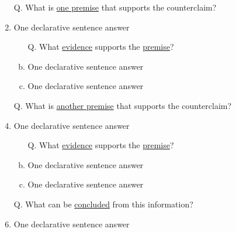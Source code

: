 \documentclass[a4paper, 12pt]{article}
\begin{document}
\begin{CJK*}{UTF8}{bsmi}
\begin{enumerate}[I.]
\begin{enumerate}[A.]
                        \begin{enumerate}[1.]
                            \item[Q.] What is \underline{one premise} that supports the {\color{red}counterclaim}?
                            \item{\color{gray} One declarative sentence answer} %
                                  \begin{enumerate}[a.]
                                      \item [Q.] What \underline{evidence} supports the \underline{premise}?
                                      \item {\color{gray} One declarative sentence answer} %
                                      \item {\color{gray} One declarative sentence answer} %
                                  \end{enumerate}
                            \item [Q.] What is \underline{another premise} that supports the {\color{red}counterclaim}?
                            \item{\color{gray} One declarative sentence answer} %
                                  \begin{enumerate}[a.]
                                      \item [Q.] What \underline{evidence} supports the \underline{premise}?
                                      \item {\color{gray} One declarative sentence answer} %
                                      \item {\color{gray} One declarative sentence answer} %
                                  \end{enumerate}
                            \item [Q.] What can be \underline{concluded} from this information?
                            \item {\color{gray} One declarative sentence answer} %
                        \end{enumerate}
              \end{enumerate}


\end{enumerate}
\end{CJK*}
\end{document}
